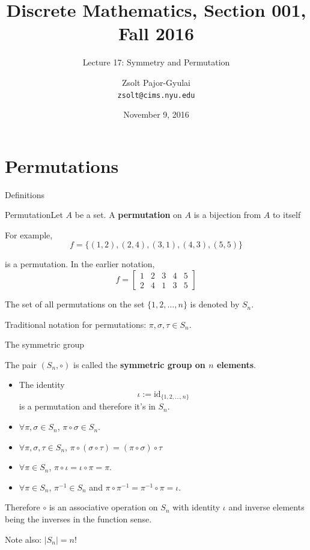 \documentclass{beamer}
\title{Discrete Mathematics, Section 001, Fall 2016}
\subtitle{Lecture 17: Symmetry and Permutation}
\date{November 9, 2016}
\author[Zsolt]{Zsolt Pajor-Gyulai \\ \texttt{zsolt@cims.nyu.edu}}
\institute[NYU] 
{
\normalsize Courant Institute of Mathematical Sciences
}
\def\bl[#1]#2{\begin{block}{#1}#2\end{block}}
\def\itemb{\begin{itemize}}
\def\iteme{\end{itemize}}
\begin{document}
\begin{frame}
  \titlepage
\end{frame}


\section{Permutations}

\begin{frame}{Definitions}
\bl[Permutation]{Let $A$ be a set. A \textbf{permutation} on $A$ is a bijection from $A$ to itself}

For example,\vspace{-0.3cm}
\[
f=\{(1,2),(2,4),(3,1),(4,3),(5,5)\}
\]\vspace{-0.7cm}

is a permutation. In the earlier notation,\vspace{-0.2cm}
\[
f=\left[\begin{array}{ccccc}
1&2&3&4&5\\
2&4&1&3&5
\end{array}\right]
\]\vspace{-0.4cm}

\bl[]{The set of all permutations on the set $\{1,2,\dots,n\}$ is denoted by $S_n$.}
Traditional notation for permutations: $\pi,\sigma,\tau\in S_n$.
\end{frame}

\begin{frame}{The symmetric group}
\bl[]{The pair $(S_n,\circ)$ is called the \textbf{symmetric group on $n$ elements}.}
\itemb
\item The identity 
\[
\iota:=\textrm{id}_{\{1,2,\dots,n\}}
\]
is a permutation and therefore it's in $S_n$.
\item $\forall\pi,\sigma\in S_n$, $\pi\circ\sigma\in S_n$.
\item $\forall\pi,\sigma,\tau\in S_n$, $\pi\circ(\sigma\circ\tau)=(\pi\circ\sigma)\circ\tau$
\item $\forall\pi\in S_n$, $\pi\circ\iota=\iota\circ\pi=\pi$.
\item $\forall\pi\in S_n$, $\pi^{-1}\in S_n$ and $\pi\circ\pi^{-1}=\pi^{-1}\circ\pi=\iota$.
\iteme

Therefore $\circ$ is an associative operation on $S_n$ with identity $\iota$ and inverse elements being the inverses in the function sense.

\vspace{0.5cm}
Note also: $|S_n|=n!$

\end{frame}
\end{document}
